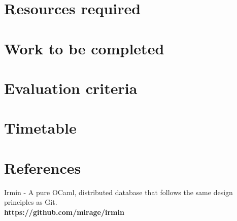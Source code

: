 \documentclass[12pt, letterpaper, twoside]{article}
\begin{document}
	\section{Resources required}
	\section{Work to be completed}
	\section{Evaluation criteria}
	\section{Timetable}
	\section{References}
	\begin{thebibliography}{9}
		Irmin - A pure OCaml, distributed database that follows the same design principles as Git.\\ \textbf{https://github.com/mirage/irmin}
		
	\end{thebibliography}
\end{document}
